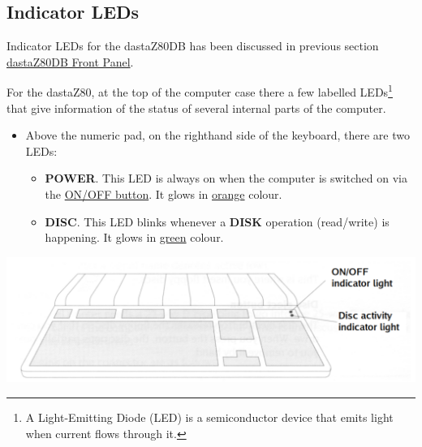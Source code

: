     \subsection{Indicator LEDs}

    Indicator LEDs for the dastaZ80DB has been discussed in previous section
    \hyperref[subsec:frontpanel]{dastaZ80DB Front Panel}.

    For the dastaZ80, at the top of the computer case there a few labelled
    LEDs\footnote{A Light-Emitting Diode (LED) is a semiconductor device that
    emits light when current flows through it.} that give information of the
    status of several internal parts of the computer.

    \begin{itemize}
        \item Above the numeric pad, on the righthand side of the keyboard,
        there are two LEDs:
        \begin{itemize}
            \item \textbf{POWER}. This LED is always on when the computer is
            switched on via the \hyperref[subsec:onoffbutt]{ON/OFF button}. It glows
            in \underline{orange} colour.
            \item \textbf{DISC}. This LED blinks whenever a \textbf{DISK} operation
            (read/write) is happening. It glows in \underline{green} colour.
        \end{itemize}
    \end{itemize}
    
    \centerline{\includegraphics[scale=0.5]{images/keyboardLEDs.png}}

